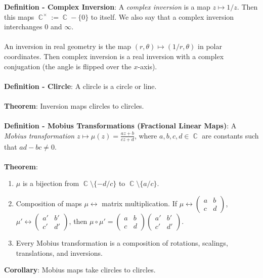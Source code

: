 \documentclass{article}
\DeclareMathOperator{\C}{\mathbb{C}}
\begin{document}
\textbf{Definition - Complex Inversion}: A \textit{complex inversion} is a map $z \mapsto 1/z$. Then this maps $\C^\times := \C - \{0\}$ to itself. We also say that a complex inversion interchanges 0 and $\infty$. \\ \\
An inversion in real geometry is the map $(r, \theta) \mapsto (1/r, \theta)$ in polar coordinates. Then complex inversion is a real inversion with a complex conjugation (the angle is flipped over the $x$-axis). \\ \\
\textbf{Definition - Clircle}: A clircle is a circle or line. \\ \\
\textbf{Theorem}: Inversion maps clircles to clircles. \\ \\
\textbf{Definition - Mobius Transformations (Fractional Linear Maps)}: A \textit{Mobius transformation} $z \mapsto \mu(z) = \frac{az + b}{cz + d}$, where $a, b, c, d \in \C$ are constants such that $ad - bc \neq 0$. \\ \\
\textbf{Theorem}: \begin{enumerate}
    \item $\mu$ is a bijection from $\C \setminus \{-d/c\}$ to $\C \setminus \{a/c\}$.
    \item Composition of maps $\mu \leftrightarrow$ matrix multiplication. If $\mu \leftrightarrow \begin{pmatrix}
        a & b \\
        c & d
    \end{pmatrix}$, $\mu' \leftrightarrow \begin{pmatrix}
        a' & b' \\
        c' & d'
    \end{pmatrix}$, then $\mu \circ \mu' = \begin{pmatrix}
        a & b \\
        c & d
    \end{pmatrix}\begin{pmatrix}
        a' & b' \\
        c' & d'
    \end{pmatrix}$.
    \item Every Mobius transformation is a composition of rotations, scalings, translations, and inversions.
\end{enumerate} $ $ \\
\textbf{Corollary}: Mobius maps take clircles to clircles. \\ \\
\end{document}
